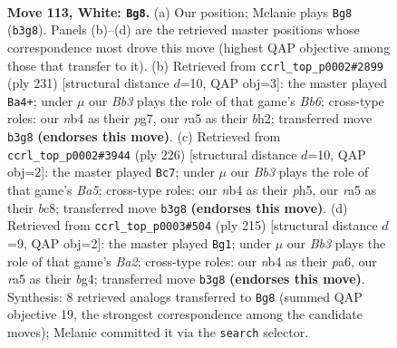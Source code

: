 \documentclass[11pt]{article}
\begin{document}
\clearpage

\begin{figure}[p]\centering
\begin{subfigure}{0.46\textwidth}\centering
\resizebox{\linewidth}{!}{%
\newchessgame
\chessboard[
  setfen={8/8/6k1/r5p1/1n6/1B4K1/8/8 w - - 10 113},
  showmover=false,
  pgfstyle=straightmove, color=movearrow, markmove={b3-g8}
]}
\caption{}
\end{subfigure}\hfill
\begin{subfigure}{0.46\textwidth}\centering
\resizebox{\linewidth}{!}{%
\newchessgame
\chessboard[
  setfen={3k4/6P1/2KP4/8/8/1b6/7B/8 b - - 16 116},
  showmover=false,
  pgfstyle=straightmove, color=movearrow, markmove={b3-a4}
]}
\caption{}
\end{subfigure}
\\[4pt]
\begin{subfigure}{0.46\textwidth}\centering
\resizebox{\linewidth}{!}{%
\newchessgame
\chessboard[
  setfen={2b5/8/8/B6p/4kp2/8/5K2/8 w - - 74 114},
  showmover=false,
  pgfstyle=straightmove, color=movearrow, markmove={a5-c7}
]}
\caption{}
\end{subfigure}\hfill
\begin{subfigure}{0.46\textwidth}\centering
\resizebox{\linewidth}{!}{%
\newchessgame
\chessboard[
  setfen={8/b3k3/P7/3P4/2K3B1/8/8/8 b - - 28 108},
  showmover=false,
  pgfstyle=straightmove, color=movearrow, markmove={a7-g1}
]}
\caption{}
\end{subfigure}
\caption{\textbf{Move 113, White: \texttt{Bg8}.} (a) Our position; Melanie plays \texttt{Bg8} (\texttt{b3g8}). Panels (b)--(d) are the retrieved master positions whose correspondence most drove this move (highest QAP objective among those that transfer to it). (b) Retrieved from \texttt{ccrl\_top\_p0002\#2899} (ply 231) [structural distance $d$=10, QAP obj=3]: the master played \texttt{Ba4+}; under $\mu$ our \emph{Bb3} plays the role of that game's \emph{Bb6}; cross-type roles: our \emph{n}b4 as their \emph{p}g7, our \emph{r}a5 as their \emph{b}h2; transferred move \texttt{b3g8} \textbf{(endorses this move)}. (c) Retrieved from \texttt{ccrl\_top\_p0002\#3944} (ply 226) [structural distance $d$=10, QAP obj=2]: the master played \texttt{Bc7}; under $\mu$ our \emph{Bb3} plays the role of that game's \emph{Ba5}; cross-type roles: our \emph{n}b4 as their \emph{p}h5, our \emph{r}a5 as their \emph{b}c8; transferred move \texttt{b3g8} \textbf{(endorses this move)}. (d) Retrieved from \texttt{ccrl\_top\_p0003\#504} (ply 215) [structural distance $d$=9, QAP obj=2]: the master played \texttt{Bg1}; under $\mu$ our \emph{Bb3} plays the role of that game's \emph{Ba2}; cross-type roles: our \emph{n}b4 as their \emph{p}a6, our \emph{r}a5 as their \emph{b}g4; transferred move \texttt{b3g8} \textbf{(endorses this move)}. Synthesis: 8 retrieved analogs transferred to \texttt{Bg8} (summed QAP objective 19, the strongest correspondence among the candidate moves); Melanie committed it via the \texttt{search} selector.}
\label{fig:thought-m224}
\end{figure}
\end{document}
